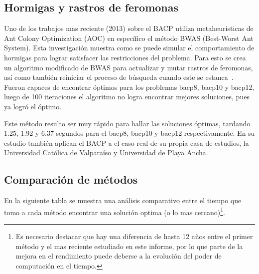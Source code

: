 \documentclass[letterpaper,10pt]{article}
\begin{document}
\subsection{Hormigas y rastros de feromonas}
Uno de los trabajos mas reciente (2013) sobre el BACP utiliza metaheurísticas de Ant Colony Optimization (AOC) en específico el método BWAS (Best-Worst Ant System). Esta investigación muestra como se puede simular el comportamiento de hormigas para lograr satisfacer las restricciones del problema. Para esto se crea un algoritmo modificado de BWAS para actualizar y mutar rastros de feromonas, así como también reiniciar el proceso de búsqueda cuando este se estanca~\cite{IOPORT.06373100}. Fueron capaces de encontrar óptimos para los problemas bacp8, bacp10 y bacp12, luego de 100 iteraciones el algoritmo no logra encontrar mejores soluciones, pues ya logró el óptimo.

Este método resulto ser muy rápido para hallar las soluciones óptimas, tardando  1.25, 1.92 y 6.37 segundos para el bacp8, bacp10 y bacp12 respectivamente. En su estudio también aplican el BACP a el caso real de su propia casa de estudios, la Universidad Católica de Valparaíso y Universidad de Playa Ancha.


\subsection{Comparación de métodos}

En la siguiente tabla se muestra una análisis comparativo entre el tiempo que tomo a cada método encontrar una solución optima (o lo mas cercano)\footnote{Es necesario destacar que hay una diferencia de hasta 12 años entre el primer método y el mas reciente estudiado en este informe, por lo que parte de la mejora en el rendimiento puede deberse a la evolución del poder de computación en el tiempo.}.
\end{document}
